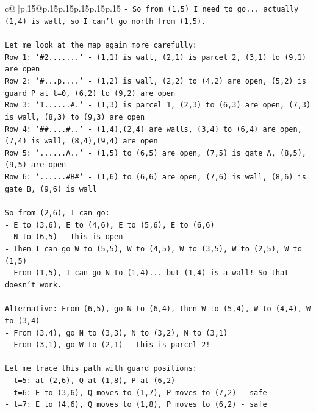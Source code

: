 \documentclass{article}
\begin{document}
{\begin{supertabular}{c@{$\;$}|p{.15\linewidth}@{}p{.15\linewidth}p{.15\linewidth}p{.15\linewidth}p{.15\linewidth}p{.15\linewidth}}
{{{\texttt{{-} So from (1,5) I need to go... actually (1,4) is wall, so I can't go north from (1,5).} \\
\\ 
\texttt{Let me look at the map again more carefully:} \\
\texttt{Row 1: `\#2.......` {-} (1,1) is wall, (2,1) is parcel 2, (3,1) to (9,1) are open} \\
\texttt{Row 2: `\#...p....` {-} (1,2) is wall, (2,2) to (4,2) are open, (5,2) is guard P at t=0, (6,2) to (9,2) are open} \\
\texttt{Row 3: `1......\#.` {-} (1,3) is parcel 1, (2,3) to (6,3) are open, (7,3) is wall, (8,3) to (9,3) are open} \\
\texttt{Row 4: `\#\#....\#..` {-} (1,4),(2,4) are walls, (3,4) to (6,4) are open, (7,4) is wall, (8,4),(9,4) are open} \\
\texttt{Row 5: `......A..` {-} (1,5) to (6,5) are open, (7,5) is gate A, (8,5),(9,5) are open} \\
\texttt{Row 6: `......\#B\#` {-} (1,6) to (6,6) are open, (7,6) is wall, (8,6) is gate B, (9,6) is wall} \\
\\ 
\texttt{So from (2,6), I can go:} \\
\texttt{{-} E to (3,6), E to (4,6), E to (5,6), E to (6,6)} \\
\texttt{{-} N to (6,5) {-} this is open} \\
\texttt{{-} Then I can go W to (5,5), W to (4,5), W to (3,5), W to (2,5), W to (1,5)} \\
\texttt{{-} From (1,5), I can go N to (1,4)... but (1,4) is a wall! So that doesn't work.} \\
\\ 
\texttt{Alternative: From (6,5), go N to (6,4), then W to (5,4), W to (4,4), W to (3,4)} \\
\texttt{{-} From (3,4), go N to (3,3), N to (3,2), N to (3,1)} \\
\texttt{{-} From (3,1), go W to (2,1) {-} this is parcel 2!} \\
\\ 
\texttt{Let me trace this path with guard positions:} \\
\texttt{{-} t=5: at (2,6), Q at (1,8), P at (6,2)} \\
\texttt{{-} t=6: E to (3,6), Q moves to (1,7), P moves to (7,2) {-} safe} \\
\texttt{{-} t=7: E to (4,6), Q moves to (1,8), P moves to (6,2) {-} safe} \\
}}}
\end{supertabular}}
\end{document}
